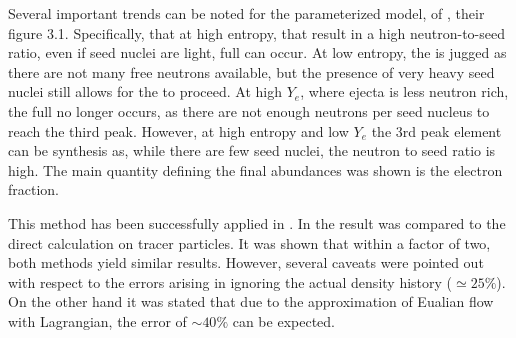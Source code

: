 Several important trends can be noted for the parameterized model,
of \citet{Lippuner:2018phd}, their figure 3.1.
Specifically, that at high entropy, that result in a high neutron-to-seed ratio, 
even if seed nuclei are light, full \rproc{} can occur.
At low entropy, the \rproc{} is jugged as there are not many free neutrons available,
but the presence of very heavy seed nuclei still allows for the \nuc{} to proceed. 
At high $Y_e$, where ejecta is less neutron rich, the full \rproc{} no longer occurs,  
as there are not enough neutrons per seed nucleus to reach the third peak.
However, at high entropy and low $Y_e$ the $3$rd peak element can be synthesis as, while 
there are few seed nuclei, the neutron to seed ratio is high.
%
The main quantity defining the final abundances was shown is the electron fraction.

This method has been successfully applied in \citet{Radice:2016dwd,Radice:2018pdn}.
In \citet{Radice:2018pdn} the result was compared to the direct \nuc{} calculation on
tracer particles. 
It was shown that within a factor of two, both methods yield similar results. However, several 
caveats were pointed out with respect to the errors arising in ignoring the actual density 
history (${\simeq}25\%$). On the other hand it was stated that due to the approximation of 
Eualian flow with Lagrangian, the error of ${\sim}40\%$ can be expected.


